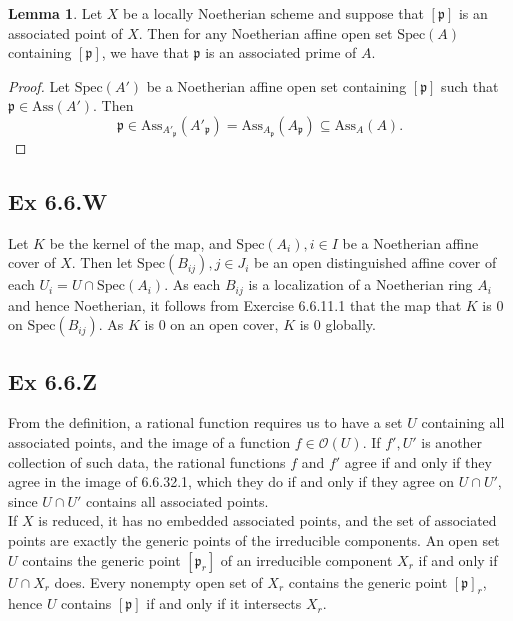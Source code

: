\documentclass{article}
\theoremstyle{definition}
\newtheorem{lemma}[theorem]{Lemma}
\newcommand{\Spec}{\text{Spec}}
\newcommand{\Ass}{\text{Ass}}
\begin{document}
\begin{lemma}
	Let $X$ be a locally Noetherian scheme and suppose that $[\mathfrak{p}]$ is
	an associated point of $X$. Then for any Noetherian affine open set
	$\Spec(A)$ containing $[\mathfrak{p}]$, we have that $\mathfrak{p}$ is an
	associated prime of $A$.
\end{lemma}
\begin{proof}
	Let $\Spec(A')$ be a Noetherian affine open set containing $[\mathfrak{p}]$
	such that $\mathfrak{p} \in \Ass(A')$. Then
	\[
		\mathfrak{p}
		\in
		\Ass_{A'_{\mathfrak{p}}}(A'_{\mathfrak{p}})
		=
		\Ass_{A_{\mathfrak{p}}}(A_{\mathfrak{p}})
		\subseteq
		\Ass_{A}(A).
	\]
\end{proof}

\subsection*{Ex 6.6.W}

Let $K$ be the kernel of the map, and $\Spec(A_i), i \in I$ be a Noetherian
affine cover of $X$. Then let $\Spec(B_{ij}), j \in J_i$ be an open
distinguished affine cover of each $U_i = U \cap \Spec(A_i)$. As each $B_{ij}$
is a localization of a Noetherian ring $A_i$ and hence Noetherian, it follows
from Exercise 6.6.11.1 that the map that $K$ is $0$ on $\Spec(B_{ij})$. As $K$
is $0$ on an open cover, $K$ is $0$ globally.

\subsection*{Ex 6.6.Z}

From the definition, a rational function requires us to have a set $U$
containing all associated points, and the image of a function $f \in
	\mathcal{O}(U)$. If $f', U'$ is another collection of such data, the rational
functions $f$ and $f'$ agree if and only if they agree in the image of
6.6.32.1, which they do if and only if they agree on $U \cap U'$, since $U \cap
	U'$ contains all associated points. \\

If $X$ is reduced, it has no embedded associated points, and the set of
associated points are exactly the generic points of the irreducible components.
An open set $U$ contains the generic point $[\mathfrak{p}_r]$ of an irreducible
component $X_r$ if and only if $U \cap X_r$ does. Every nonempty open set of
$X_r$ contains the generic point $[\mathfrak{p}]_r$, hence $U$ contains
$[\mathfrak{p}]$ if and only if it intersects $X_r$.
\end{document}
